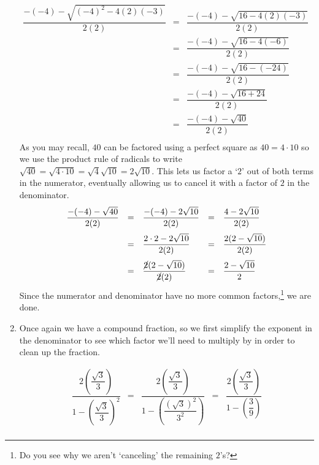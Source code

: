 \begin{ex}
\begin{enumerate}
\[\begin{array}{rclr}
\dfrac{-(-4) -\sqrt{(-4)^2-4(2)(-3)}}{2(2)}  & = & \dfrac{-(-4) - \sqrt{16-4(2)(-3)}}{2(2)} & \\[12pt]
                                             & = & \dfrac{-(-4) - \sqrt{16-4(-6)}}{2(2)} & \\[12pt]
																						& = & \dfrac{-(-4) - \sqrt{16-(-24)}}{2(2)} & \\[12pt]
				                                     & = & \dfrac{-(-4) - \sqrt{16+24}}{2(2)} & \\[12pt]
																						    & = & \dfrac{-(-4) - \sqrt{40}}{2(2)} & \\ \end{array} \] As you may recall, $40$ can be factored using a perfect square as $40 = 4 \cdot 10$ so we use the product rule of radicals to write $\sqrt{40} = \sqrt{4 \cdot 10} = \sqrt{4} \sqrt{10} = 2 \sqrt{10}$.  This lets us factor a `$2$' out of both terms in the numerator, eventually allowing us to cancel it with a factor of $2$ in the denominator.\[ \begin{array}{rclcl}

 \dfrac{-(-4) - \sqrt{40}}{2(2)} & = &  \dfrac{-(-4) - 2\sqrt{10}}{2(2)} & = &  \dfrac{4  - 2\sqrt{10}}{2(2)} \\ [12pt]
                                 & = &  \dfrac{2 \cdot 2  - 2\sqrt{10}}{2(2)} & = &  \dfrac{2(2  - \sqrt{10})}{2(2)} \\ [12pt]
																& = &  \dfrac{\cancel{2}(2  - \sqrt{10})}{\cancel{2}(2)} & = &  \dfrac{2  - \sqrt{10}}{2} \\ \end{array} \]Since the numerator and denominator have no more common factors,\footnote{Do you see why we aren't `canceling' the remaining $2$'s?} we are done.

\item  Once again we have a compound fraction, so we first simplify the exponent in the denominator to see which factor we'll need to multiply by in order to clean up the fraction.

\[ \begin{array}{rclcl}

\dfrac{2 \left( \dfrac{\sqrt{3}}{3}\right)}{1 - \left( \dfrac{\sqrt{3}}{3} \right)^2} & = & \dfrac{2 \left( \dfrac{\sqrt{3}}{3}\right)}{1 - \left( \dfrac{(\sqrt{3})^2}{3^2} \right)} & = & \dfrac{2 \left( \dfrac{\sqrt{3}}{3}\right)}{1 - \left( \dfrac{3}{9} \right)}\\ [25pt]
																				

\end{array}\]
\end{enumerate}
\end{ex}
